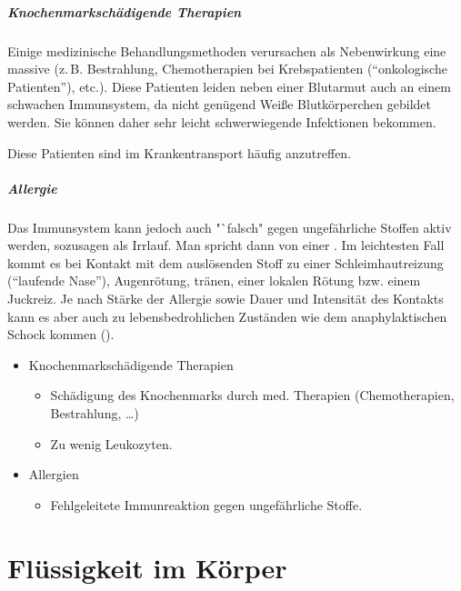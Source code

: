 {\subparagraph{Knochenmarkschädigende Therapien}Einige medizinische
Behandlungsmethoden verursachen als Nebenwirkung eine massive  (z.\,B.
Bestrahlung, Chemotherapien bei Krebspatienten ("`onkologische Patienten"'),
etc.). Diese Patienten leiden neben einer Blutarmut auch an einem schwachen
Immunsystem, da nicht genügend Weiße Blutkörperchen gebildet werden. Sie können
daher sehr leicht schwerwiegende Infektionen bekommen.

Diese Patienten
sind im Krankentransport häufig anzutreffen.

\subparagraph{Allergie}
\label{topic:allergie}
Das Immunsystem kann jedoch auch "`falsch" gegen
ungefährliche Stoffen aktiv werden, sozusagen als Irrlauf. Man spricht dann von
einer . Im leichtesten Fall kommt es bei Kontakt mit dem
auslösenden Stoff zu einer Schleimhautreizung ("`laufende Nase"'), Augenrötung,
tränen, einer lokalen Rötung bzw. einem Juckreiz. Je nach Stärke der Allergie
sowie Dauer und Intensität des Kontakts kann es aber auch zu
lebensbedrohlichen Zuständen wie dem anaphylaktischen Schock kommen
(). 
}{
\begin{itemize}
  \item Knochenmarkschädigende Therapien
  \begin{itemize}
    \item Schädigung des Knochenmarks durch med. Therapien (Chemotherapien,
    Bestrahlung, \ldots)
    \item Zu wenig Leukozyten.
  \end{itemize}
  \item Allergien
  \begin{itemize}
    \item Fehlgeleitete Immunreaktion gegen ungefährliche Stoffe.
  \end{itemize}
\end{itemize}
}{}{}{}






\clearpage
\section{Flüssigkeit im Körper}

